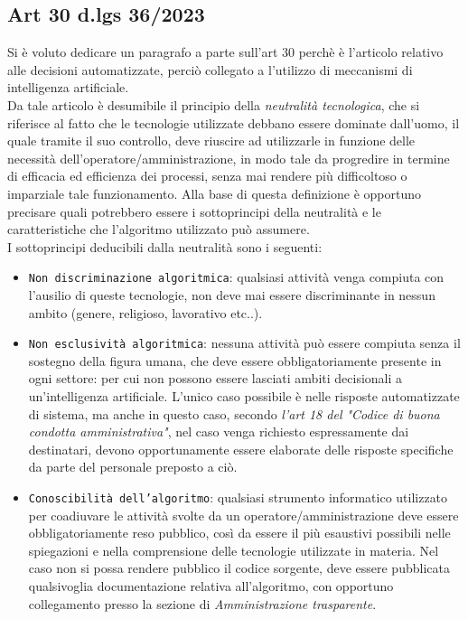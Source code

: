 \documentclass{article}
\begin{document}
\newpage\subsection{Art 30 d.lgs 36/2023}
\begin{justify}
    Si è voluto dedicare un paragrafo a parte sull'art 30 perchè è l'articolo relativo alle decisioni automatizzate, perciò collegato a l'utilizzo di meccanismi di intelligenza artificiale.\\
    Da tale articolo è desumibile il principio della \textit{neutralità tecnologica}, che si riferisce al fatto che le tecnologie utilizzate debbano essere dominate dall'uomo, il quale tramite il suo controllo, deve riuscire ad utilizzarle in funzione delle necessità dell'operatore/amministrazione, in modo tale da progredire in termine di efficacia ed efficienza dei processi, senza mai rendere più  difficoltoso o imparziale tale funzionamento.
    Alla base di questa definizione è opportuno precisare quali potrebbero essere i sottoprincipi della neutralità e le caratteristiche che l'algoritmo utilizzato può assumere.\\
    I sottoprincipi deducibili dalla neutralità sono i seguenti:
    \begin{itemize}
        \item \texttt{Non discriminazione algoritmica}: qualsiasi attività venga compiuta con l'ausilio di queste tecnologie, non deve mai essere discriminante in nessun ambito (genere, religioso, lavorativo etc..).
        \item \texttt{Non esclusività algoritmica}: nessuna attività può essere compiuta senza il sostegno della figura umana, che deve essere obbligatoriamente presente in ogni settore: per cui non possono essere lasciati ambiti decisionali a un'intelligenza artificiale. L'unico caso possibile è nelle risposte automatizzate di sistema, ma anche in questo caso, secondo \textit{l'art 18 del "Codice di buona condotta amministrativa"}, nel caso venga richiesto espressamente dai destinatari, devono opportunamente essere elaborate delle risposte specifiche da parte del personale preposto a ciò.
        \item \texttt{Conoscibilità dell'algoritmo}: qualsiasi strumento informatico utilizzato per coadiuvare le attività svolte da un operatore/amministrazione deve essere obbligatoriamente reso pubblico, così da essere il più esaustivi possibili nelle spiegazioni e nella comprensione delle tecnologie utilizzate in materia. Nel caso non si possa rendere pubblico il codice sorgente, deve essere pubblicata qualsivoglia documentazione relativa all'algoritmo, con opportuno collegamento presso la sezione di \textit{Amministrazione trasparente}.

\end{itemize}
\end{justify}
\end{document}
